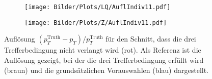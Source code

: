 \begin{figure}
  \begin{subfigure}[t]{0.55\textwidth}
  \texttt{[image: Bilder/Plots/LQ/AuflIndiv11.pdf]}
  \label{AuflIndiv11LQ}
  \end{subfigure}
\begin{subfigure}[t]{0.55\textwidth}
 \texttt{[image: Bilder/Plots/Z/AuflIndiv11.pdf]}
  \label{AuflIndiv11Z}
\end{subfigure}
\caption{Auflösung $(p_T^{\text{Truth}}-p_T)/p_T^{\text{Truth}}$ für den Schnitt, dass die drei Trefferbedingung nicht verlangt wird (rot). Als Referenz ist die Auflösung gezeigt, bei der die drei Trefferbedingung erfüllt wird (braun) und die grundsätzlichen Vorauswahlen (blau) dargestellt.}
\label{AuflIndiv11}
\end{figure}
%
%
